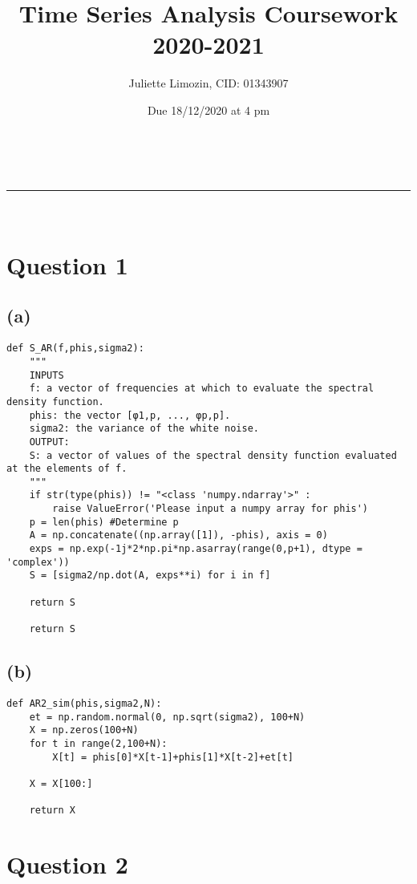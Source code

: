 \documentclass[a4paper,11pt]{article}
\makeatletter
\newcommand{\linia}{\rule{\linewidth}{0.5pt}}
\theoremstyle{mytheor}
\renewcommand{\maketitle}{
\begin{center}
\vspace{2ex}
{\huge \textsc{\@title}}
\vspace{1ex}
\\
\linia\\
\@author \hfill \@date
\vspace{1ex}
\end{center}
}
\makeatother
\begin{document}
\title{Time Series Analysis Coursework 2020-2021}

\author{Juliette Limozin, CID: 01343907}

\date{Due 18/12/2020 at 4 pm}

\maketitle

\section*{Question 1}
\subsection*{(a)}

\begin{lstlisting}
def S_AR(f,phis,sigma2):
    """
    INPUTS
    f: a vector of frequencies at which to evaluate the spectral density function.
    phis: the vector [φ1,p, ..., φp,p].
    sigma2: the variance of the white noise.
    OUTPUT:
    S: a vector of values of the spectral density function evaluated at the elements of f.
    """
    if str(type(phis)) != "<class 'numpy.ndarray'>" :
        raise ValueError('Please input a numpy array for phis')
    p = len(phis) #Determine p
    A = np.concatenate((np.array([1]), -phis), axis = 0)
    exps = np.exp(-1j*2*np.pi*np.asarray(range(0,p+1), dtype = 'complex'))
    S = [sigma2/np.dot(A, exps**i) for i in f]
    
    return S
    
    return S
\end{lstlisting}

\subsection*{(b)}

\begin{lstlisting}
def AR2_sim(phis,sigma2,N):
    et = np.random.normal(0, np.sqrt(sigma2), 100+N)
    X = np.zeros(100+N)
    for t in range(2,100+N):
        X[t] = phis[0]*X[t-1]+phis[1]*X[t-2]+et[t]
    
    X = X[100:]
    
    return X
\end{lstlisting}

\newpage

\section*{Question 2}
\end{document}
